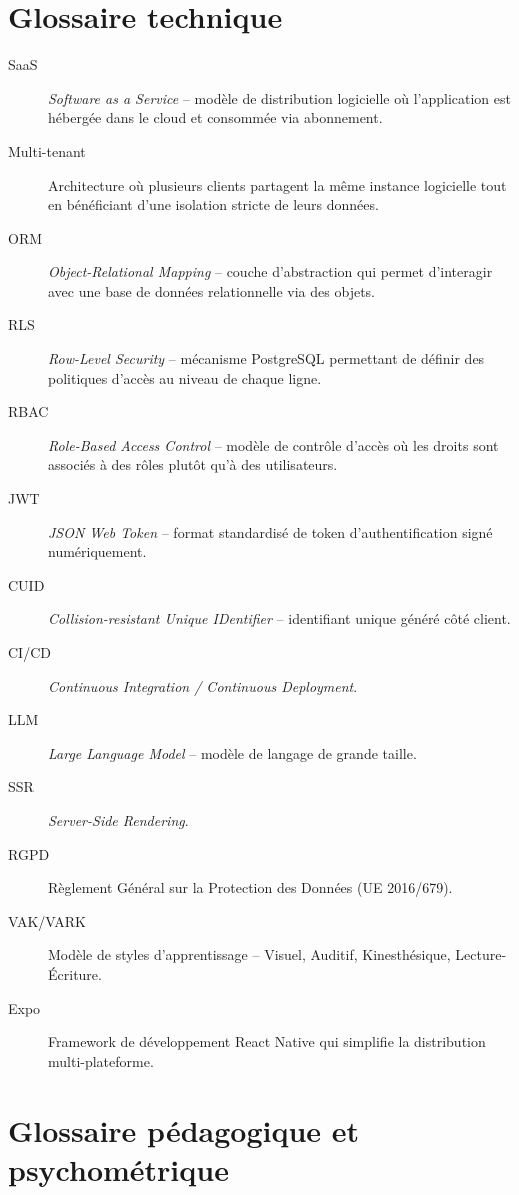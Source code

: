 \documentclass[12pt,a4paper,oneside]{report}
\begin{document}
\appendix

\chapter{Glossaire technique}

\begin{description}
  \item[SaaS] \textit{Software as a Service} -- modèle de distribution logicielle où l'application est hébergée dans le cloud et consommée via abonnement.
  \item[Multi-tenant] Architecture où plusieurs clients partagent la même instance logicielle tout en bénéficiant d'une isolation stricte de leurs données.
  \item[ORM] \textit{Object-Relational Mapping} -- couche d'abstraction qui permet d'interagir avec une base de données relationnelle via des objets.
  \item[RLS] \textit{Row-Level Security} -- mécanisme PostgreSQL permettant de définir des politiques d'accès au niveau de chaque ligne.
  \item[RBAC] \textit{Role-Based Access Control} -- modèle de contrôle d'accès où les droits sont associés à des rôles plutôt qu'à des utilisateurs.
  \item[JWT] \textit{JSON Web Token} -- format standardisé de token d'authentification signé numériquement.
  \item[CUID] \textit{Collision-resistant Unique IDentifier} -- identifiant unique généré côté client.
  \item[CI/CD] \textit{Continuous Integration / Continuous Deployment}.
  \item[LLM] \textit{Large Language Model} -- modèle de langage de grande taille.
  \item[SSR] \textit{Server-Side Rendering}.
  \item[RGPD] Règlement Général sur la Protection des Données (UE 2016/679).
  \item[VAK/VARK] Modèle de styles d'apprentissage -- Visuel, Auditif, Kinesthésique, Lecture-Écriture.
  \item[Expo] Framework de développement React Native qui simplifie la distribution multi-plateforme.
\end{description}

\chapter{Glossaire pédagogique et psychométrique}
\end{document}
